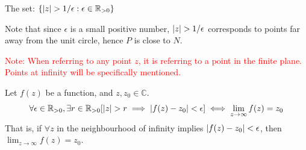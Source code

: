 \documentclass[12pt, english]{book}
\begin{document}
	\begin{definition}
		The set: $\{\abs{z} > 1/\epsilon : \epsilon \in \mathbb{R}_{>0} \}$
	\end{definition}
	Note that since $\epsilon$ is a small positive number, $\abs{z} > 1/\epsilon$ corresponds to points far away from the unit circle, hence $P$ is close to $N$. 
	
	\textcolor{red}{Note: When referring to any point $z$, it is referring to a point in the finite plane. Points at infinity will be specifically mentioned.}
	
	\begin{definition}
		\label{Limit at Infinity Definition - Complex}
		Let \(f(z)\) be a function, and \(z, z_0 \in \mathbb{C}\).
		\begin{align*}
			\forall \epsilon \in \mathbb{R}_{>0}, \exists r \in \mathbb{R}_{>0}[\abs{z} > r \implies \abs{f(z)-z_0}<\epsilon] \iff \lim_{z\rightarrow \infty} f(z) = z_0
		\end{align*}
		That is, if \(\forall z\) in the neighbourhood of infinity implies \(\abs{f(z) - z_0} < \epsilon\), then \(\lim_{z \rightarrow \infty} f(z) = z_0\).
	\end{definition}
	
\end{document}
